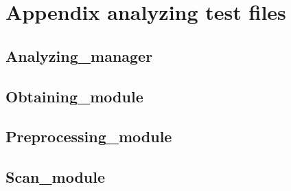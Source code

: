 \chapter{Appendix analyzing test files}

\section{Analyzing\_manager}


\section{Obtaining\_module}


\section{Preprocessing\_module}


\section{Scan\_module}
